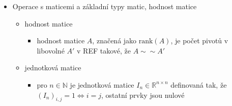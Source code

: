 \begin{itemize}
\begin{itemize}
\begin{itemize}
\item existuje bijekce $\bar x \mapsto \bar x + x^0$ mezi množinami $\lbrace \bar x: A\bar x=0\rbrace$ a $\lbrace x: Ax=b\rbrace$
\begin{itemize}
\item pokud $x^0$ splňuje $Ax^0=b$
\end{itemize}
\item množinu řešení soustavy $Ax=b$ popíšeme jako $x=y+p_1\overline x_1+p_2\overline x_2+\dots+p_{n-r}\overline x_{n-r}$
\item $y$ \dots{} libovolné řešení soustavy $Ax=b$
\begin{itemize}
\item u homogenní soustavy to typicky bude nulový vektor
\item je to člen, který odpovídá tomu $x^0$ výše
\end{itemize}
\item $p_i\overline x_i$
\begin{itemize}
\item takový člen tam bude za každou volnou proměnnou (bude jich $n-r$, tedy počet řádků - hodnost matice)
\item $p_i$ je libovolný reálný parametr
\item tyhle členy můžeme získat tak, že řešíme soustavu $A\overline x=0$ a řešení vyjádříme pomocí parametrů (a pak je vytkneme)
\item nebo je lze vyčíst z RREF matice
\item ve vektoru $\overline x_i$ bude typicky jednička na místě odpovídající volné proměnné a nuly u všech ostatních volných proměnných (protože je to vlastně složka, která se stará o konkrétní volnou proměnnou)
\end{itemize}
\end{itemize}
\end{itemize}
\item Operace s maticemi a základní typy matic, hodnost matice
\begin{itemize}
\item hodnost matice
\begin{itemize}
\item hodnost matice $A$, značená jako $\mathrm{rank}(A)$, je počet pivotů v libovolné $A'$ v REF takové, že $A\sim\sim A'$
\end{itemize}
\item jednotková matice
\begin{itemize}
\item pro $n \in \mathbb{N}$ je jednotková matice $I_n \in \mathbb{R}^{n\times n}$ definovaná tak, že $(I_n)_{i,j} = 1 \iff i=j$, ostatní prvky jsou nulové 

\end{itemize}
\end{itemize}
\end{itemize}
